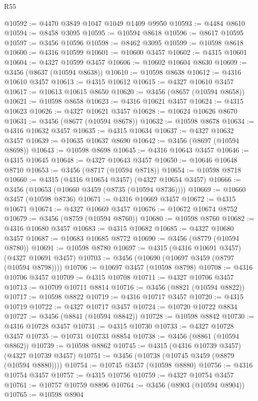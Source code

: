 \begin{lexlean}{R55}
\begin{coremodule}
@10592 := @4470 @3849 @1047 @1049 @1409 @9950
@10593 := @4484 @8610
@10594 := @8458 @3095
@10595 := @10594 @8618
@10596 := @8617 @10595
@10597 := @3456 @10596
@10598 := @8462 @3095
@10599 := @10598 @8618
@10600 := @4316 @10599
@10601 := @10600 @3457
@10602 := @4315 @10601
@10604 := @4327 @10599 @3457
@10606 := @10602 @10604 @8630
@10609 := @3456 (@8637 (@10594 @8638))
@10610 := @10598 @8638
@10612 := @4316 @10610 @3457
@10613 := @4315 @10612
@10615 := @4327 @10610 @3457
@10617 := @10613 @10615 @8650
@10620 := @3456 (@8657 (@10594 @8658))
@10621 := @10598 @8658
@10623 := @4316 @10621 @3457
@10624 := @4315 @10623
@10626 := @4327 @10621 @3457
@10628 := @10624 @10626 @8670
@10631 := @3456 (@8677 (@10594 @8678))
@10632 := @10598 @8678
@10634 := @4316 @10632 @3457
@10635 := @4315 @10634
@10637 := @4327 @10632 @3457
@10639 := @10635 @10637 @8690
@10642 := @3456 (@8697 (@10594 @8698))
@10643 := @10598 @8698
@10645 := @4316 @10643 @3457
@10646 := @4315 @10645
@10648 := @4327 @10643 @3457
@10650 := @10646 @10648 @8710
@10653 := @3456 (@8717 (@10594 @8718))
@10654 := @10598 @8718
@10660 := @4315 (@4316 @10654 @3457) (@4327 @10654 @3457)
@10666 := @3456 (@10653 (@10660 @3459 (@8735 (@10594 @8736))))
@10669 := @10660 @3457 (@10598 @8736)
@10671 := @4316 @10669 @3457
@10672 := @4315 @10671
@10674 := @4327 @10669 @3457
@10676 := @10672 @10674 @8752
@10679 := @3456 (@8759 (@10594 @8760))
@10680 := @10598 @8760
@10682 := @4316 @10680 @3457
@10683 := @4315 @10682
@10685 := @4327 @10680 @3457
@10687 := @10683 @10685 @8772
@10690 := @3456 (@8779 (@10594 @8780))
@10691 := @10598 @8780
@10697 := @4315 (@4316 @10691 @3457) (@4327 @10691 @3457)
@10703 := @3456 (@10690 (@10697 @3459 (@8797 (@10594 @8798))))
@10706 := @10697 @3457 (@10598 @8798)
@10708 := @4316 @10706 @3457
@10709 := @4315 @10708
@10711 := @4327 @10706 @3457
@10713 := @10709 @10711 @8814
@10716 := @3456 (@8821 (@10594 @8822))
@10717 := @10598 @8822
@10719 := @4316 @10717 @3457
@10720 := @4315 @10719
@10722 := @4327 @10717 @3457
@10724 := @10720 @10722 @8834
@10727 := @3456 (@8841 (@10594 @8842))
@10728 := @10598 @8842
@10730 := @4316 @10728 @3457
@10731 := @4315 @10730
@10733 := @4327 @10728 @3457
@10735 := @10731 @10733 @8854
@10738 := @3456 (@8861 (@10594 @8862))
@10739 := @10598 @8862
@10745 := @4315 (@4316 @10739 @3457) (@4327 @10739 @3457)
@10751 := @3456 (@10738 (@10745 @3459 (@8879 (@10594 @8880))))
@10754 := @10745 @3457 (@10598 @8880)
@10756 := @4316 @10754 @3457
@10757 := @4315 @10756
@10759 := @4327 @10754 @3457
@10761 := @10757 @10759 @8896
@10764 := @3456 (@8903 (@10594 @8904))
@10765 := @10598 @8904

\end{coremodule}
\end{lexlean}
